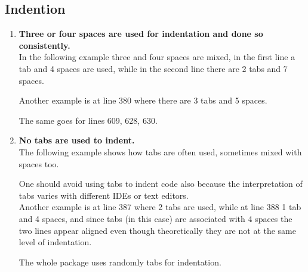 \documentclass[a4paper,11pt]{report} %
\begin{document}
		\subsection*{Indention}\begin{enumerate}[resume]
			\item \textbf{Three or four spaces are used for indentation and done so consistently.}\smallskip \\
				In the following example three and four spaces are mixed, in the first line a tab and 4 spaces are used, while in the second line there are 2 tabs and 7 spaces.
				
				Another example is at line 380 where there are 3 tabs and 5 spaces.
				
				The same goes for lines 609, 628, 630.
			\item \textbf{No tabs are used to indent.}\smallskip \\
				The following example shows how tabs are often used, sometimes mixed with spaces too.
				
				One should avoid using tabs to indent code also because the interpretation of tabs varies with different IDEs or text editors.\\
				Another example is at line 387 where 2 tabs are used, while at line 388 1 tab and 4 spaces, and since tabs (in this case) are associated with 4 spaces the two lines appear aligned even though theoretically they are not at the same level of indentation.
				
				The whole package uses randomly tabs for indentation.
		\end{enumerate}
		
\end{document}
